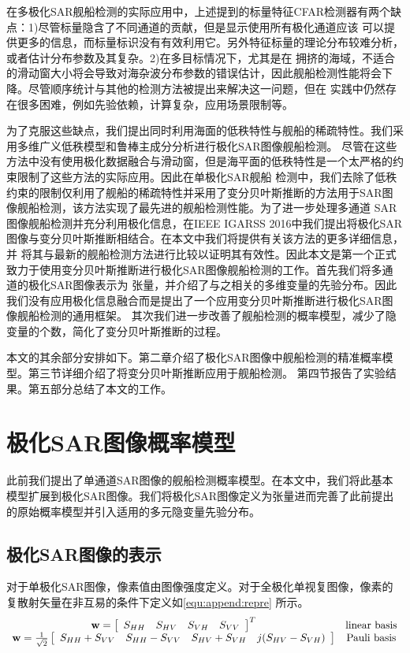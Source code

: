 在多极化SAR舰船检测的实际应用中，上述提到的标量特征CFAR检测器有两个缺点：1)尽管标量隐含了不同通道的贡献，但是显示使用所有极化通道应该
可以提供更多的信息，而标量标识没有有效利用它。另外特征标量的理论分布较难分析，或者估计分布参数及其复杂。2)在多目标情况下，尤其是在
拥挤的海域，不适合的滑动窗大小将会导致对海杂波分布参数的错误估计，因此舰船检测性能将会下降。尽管顺序统计与其他的检测方法被提出来解决这一问题，但在
实践中仍然存在很多困难，例如先验依赖，计算复杂，应用场景限制等。

为了克服这些缺点，我们提出同时利用海面的低秩特性与舰船的稀疏特性。我们采用多维广义低秩模型和鲁棒主成分分析进行极化SAR图像舰船检测。
尽管在这些方法中没有使用极化数据融合与滑动窗，但是海平面的低秩特性是一个太严格的约束限制了这些方法的实际应用。因此在单极化SAR舰船
检测中，我们去除了低秩约束的限制仅利用了舰船的稀疏特性并采用了变分贝叶斯推断的方法用于SAR图像舰船检测，该方法实现了最先进的舰船检测性能。为了进一步处理多通道
SAR图像舰船检测并充分利用极化信息，在IEEE IGARSS 2016中我们提出将极化SAR图像与变分贝叶斯推断相结合。在本文中我们将提供有关该方法的更多详细信息，并
将其与最新的舰船检测方法进行比较以证明其有效性。因此本文是第一个正式致力于使用变分贝叶斯推断进行极化SAR图像舰船检测的工作。首先我们将多通道的极化SAR图像表示为
张量，并介绍了与之相关的多维变量的先验分布。因此我们没有应用极化信息融合而是提出了一个应用变分贝叶斯推断进行极化SAR图像舰船检测的通用框架。
其次我们进一步改善了舰船检测的概率模型，减少了隐变量的个数，简化了变分贝叶斯推断的过程。

本文的其余部分安排如下。第二章介绍了极化SAR图像中舰船检测的精准概率模型。第三节详细介绍了将变分贝叶斯推断应用于舰船检测。
第四节报告了实验结果。第五部分总结了本文的工作。

\section{极化SAR图像概率模型}
此前我们提出了单通道SAR图像的舰船检测概率模型。在本文中，我们将此基本模型扩展到极化SAR图像。我们将极化SAR图像定义为张量进而完善了此前提出的原始概率模型并引入适用的多元隐变量先验分布。
\subsection{极化SAR图像的表示}
对于单极化SAR图像，像素值由图像强度定义。对于全极化单视复图像，像素的复散射矢量在非互易的条件下定义如\ref{equ:append:repre}
所示。
\begin{equation}
    \label{equ:append:repre}
    \begin{array}{*{20}{c}}
    {{\bf{w}} = {{\left[ {\begin{array}{*{20}{c}}
    {{S_{HH}}}&{{S_{HV}}}&{{S_{VH}}}&{{S_{VV}}}
    \end{array}} \right]}^T}}&{{\rm{linear\ basis}}}\\
    {{\bf{w}} = \frac{1}{{\sqrt 2 }}\left[ {\begin{array}{*{20}{c}}
    {{S_{HH}} + {S_{VV}}}&{{S_{HH}} - {S_{VV}}}&{{S_{HV}} + {S_{VH}}}&{j({S_{HV}} - {S_{VH}})}
    \end{array}} \right]}&{{\rm{Pauli\ basis}}}
    \end{array}
\end{equation}

